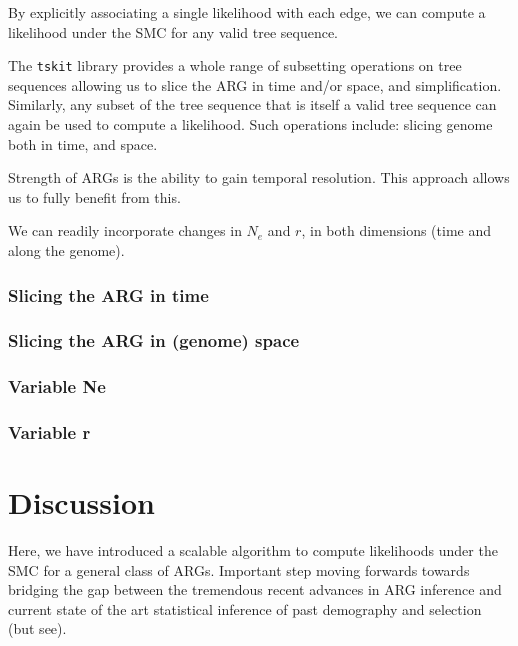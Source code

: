 \documentclass{article}
\begin{document}
By explicitly associating a single likelihood with each edge, we can compute a likelihood 
under the SMC for any valid tree sequence. 

The \texttt{tskit} library provides a whole range  
of subsetting operations on tree sequences allowing us to slice the ARG in time and/or space, 
and simplification.
Similarly, any subset of the tree sequence that is itself a valid tree sequence can again 
be used to compute a likelihood. Such operations include: slicing genome both in time, and space.

Strength of ARGs is the ability to gain temporal resolution. This approach allows us to fully 
benefit from this.

We can readily incorporate changes in $N_e$ and $r$, in both dimensions (time and along the genome).

\subsubsection{Slicing the ARG in time}

\subsubsection{Slicing the ARG in (genome) space}

\subsubsection{Variable Ne}

\subsubsection{Variable r}



\section{Discussion}
Here, we have introduced a scalable algorithm to compute likelihoods 
under the SMC for a general class of ARGs. 
Important step moving forwards towards bridging the gap between the tremendous 
recent advances in ARG inference and current state of the art statistical inference of 
past demography and selection (but see). %
\end{document}
